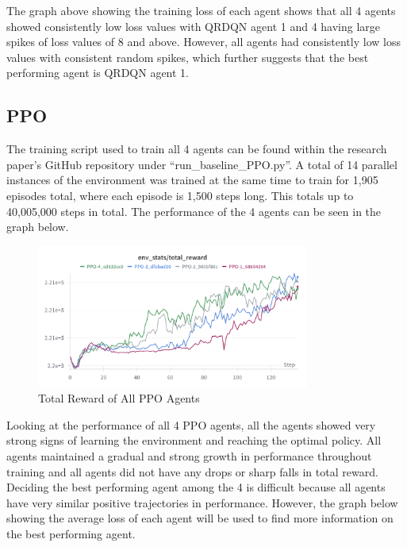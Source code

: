 The graph above showing the training loss of each agent shows that all 4 agents showed consistently low loss values with QRDQN agent 1 and 4 having large spikes of loss values of 8 and above. However, all agents had consistently low loss values with consistent random spikes, which further suggests that the best performing agent is QRDQN agent 1.

\subsection{PPO}

The training script used to train all 4 agents can be found within the research paper's GitHub repository under ``run\_baseline\_PPO.py''. A total of 14 parallel instances of the environment was trained at the same time to train for 1,905 episodes total, where each episode is 1,500 steps long. This totals up to 40,005,000 steps in total. The performance of the 4 agents can be seen in the graph below. 

\begin{figure}[H]
    \centering
    \includegraphics[width=0.8\textwidth]{figures/PPO_TotalReward.png}
    \caption{Total Reward of All PPO Agents}
    \label{fig:agent_eval_all_ppo}
\end{figure}

Looking at the performance of all 4 PPO agents, all the agents showed very strong signs of learning the environment and reaching the optimal policy. All agents maintained a gradual and strong growth in performance throughout training and all agents did not have any drops or sharp falls in total reward. Deciding the best performing agent among the 4 is difficult because all agents have very similar positive trajectories in performance. However, the graph below showing the average loss of each agent will be used to find more information on the best performing agent.

